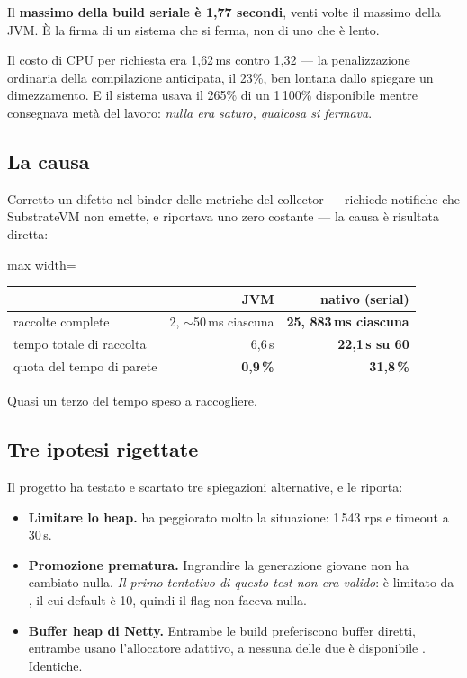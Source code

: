 Il \textbf{massimo della build seriale \`e 1{,}77 secondi}, venti volte il
massimo della JVM. \`E la firma di un sistema che si ferma, non di uno che \`e
lento.

Il costo di CPU per richiesta era 1{,}62\,ms contro 1{,}32 --- la penalizzazione
ordinaria della compilazione anticipata, il 23\%, ben lontana dallo spiegare un
dimezzamento. E il sistema usava il 265\% di un 1\,100\% disponibile mentre
consegnava met\`a del lavoro: \emph{nulla era saturo, qualcosa si fermava}.

\subsection{La causa}

Corretto un difetto nel binder delle metriche del collector --- 
richiede notifiche che SubstrateVM non emette, e riportava uno zero costante ---
la causa \`e risultata diretta:

\begin{center}
\small
\begin{adjustbox}{max width=\textwidth}
\begin{tabular}{@{}lrr@{}}
\toprule
 & \textbf{JVM} & \textbf{nativo (serial)} \\
\midrule
raccolte complete & 2, $\sim$50\,ms ciascuna & \textbf{25, 883\,ms ciascuna} \\
tempo totale di raccolta & 6{,}6\,s & \textbf{22{,}1\,s su 60} \\
quota del tempo di parete & \textbf{0{,}9\,\%} & \textbf{31{,}8\,\%} \\
\bottomrule
\end{tabular}
\end{adjustbox}
\end{center}

Quasi un terzo del tempo speso a raccogliere.

\subsection{Tre ipotesi rigettate}

Il progetto ha testato e scartato tre spiegazioni alternative, e le riporta:

\begin{itemize}[leftmargin=*]
  \item \textbf{Limitare lo heap.}  ha peggiorato molto la
  situazione: 1\,543 rps e timeout a 30\,s.
  \item \textbf{Promozione prematura.} Ingrandire la generazione giovane non ha
  cambiato nulla. \emph{Il primo tentativo di questo test non era valido}:
   \`e limitato da
  , il cui default \`e 10, quindi il
  flag non faceva nulla.
  \item \textbf{Buffer heap di Netty.} Entrambe le build preferiscono buffer
  diretti, entrambe usano l'allocatore adattivo, a nessuna delle due \`e
  disponibile . Identiche.
\end{itemize}

